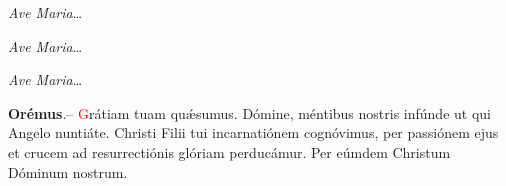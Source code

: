 
\vspace{1mm}

\textit{Ave Maria}\ldots

\vspace{1mm}


\vspace{1mm}

\textit{Ave Maria}\ldots

\vspace{1mm}


\vspace{1mm}

\textit{Ave Maria}\ldots

\vspace{1mm}



\vspace{1mm}

\textbf{Orémus}.-- \textcolor{red}{G}rátiam tuam qu{\'\ae}sumus. Dómine, méntibus nostris infúnde ut qui Angelo nuntiáte.
Christi Filii tui incarnatiónem cognóvimus, per passiónem ejus et crucem ad resurrectiónis glóriam perducámur.
Per eúmdem Christum Dóminum nostrum.\\[1mm]
